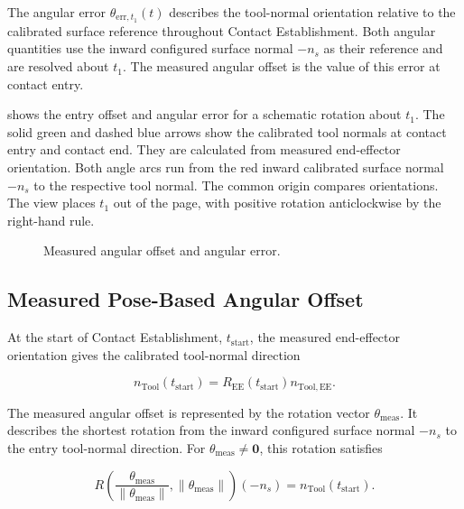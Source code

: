 The angular error \mbox{\(\theta_{\mathrm{err},t_1}(t)\)} describes the tool-normal
orientation relative to the calibrated surface reference throughout Contact
Establishment. Both angular quantities use the inward configured surface normal
\mbox{\(-n_s\)} as their reference and are resolved about \mbox{\(t_1\)}.
The measured angular offset is the value of this error at contact entry.

\Needspace{0.42\textheight}
 shows the entry offset and angular error
for a schematic rotation about \mbox{\(t_1\)}. The solid green and dashed blue
arrows show the calibrated tool normals at contact entry and contact end.
They are calculated from measured end-effector orientation.
Both angle arcs run from the red inward calibrated surface normal
\mbox{\(-n_s\)} to the respective tool normal. The common origin compares orientations.
The view places \mbox{\(t_1\)} out of the page, with positive rotation
anticlockwise by the right-hand rule.

\begin{figure}[H]
  \centering
  
  \caption{Measured angular offset and angular error.}
  \label{fig:surface_reference_geometry}
  \label{fig:rotation_sign_convention}
\end{figure}

\subsection{Measured Pose-Based Angular Offset}
\label{subsec:initial_angular_deviation}

At the start of Contact Establishment,
\mbox{\(t_{\mathrm{start}}\)}, the measured end-effector orientation gives
the calibrated tool-normal direction

\begin{equation}
n_{\mathrm{Tool}}(t_{\mathrm{start}})
=
R_{\mathrm{EE}}(t_{\mathrm{start}})n_{\mathrm{Tool,EE}}.
\label{eq:achieved_tool_normal}
\end{equation}

The measured angular offset is represented by the rotation vector
\mbox{\(\theta_{\mathrm{meas}}\)}.
It describes the shortest rotation from the inward configured surface normal
\mbox{\(-n_s\)} to the entry tool-normal direction.
For \mbox{\(\theta_{\mathrm{meas}}\neq\mathbf{0}\)}, this rotation satisfies

\begin{equation}
R\left(\frac{\theta_{\mathrm{meas}}}{\lVert\theta_{\mathrm{meas}}\rVert},
\lVert\theta_{\mathrm{meas}}\rVert\right)(-n_s)
=n_{\mathrm{Tool}}(t_{\mathrm{start}}).
\label{eq:initial_deviation_rotation}
\end{equation}


